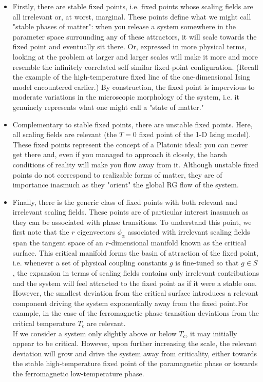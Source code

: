 \begin{itemize}
\item Firstly, there are stable fixed points, i.e. fixed points whose scaling fields are all irrelevant or, at worst, marginal. 
These points define what we might call "stable phases of
matter": when you release a system somewhere in the parameter space surrounding any of these attractors, it will scale towards the fixed point and eventually sit there. Or,
expressed in more physical terms, looking at the problem at larger and larger scales will make it more and more resemble the infinitely correlated self-similar fixed-point configuration. (Recall the example of the high-temperature fixed line of the one-dimensional Ising
model encountered earlier.) 
By construction, the fixed point is impervious to moderate
variations in the microscopic morphology of the system, i.e. it genuinely represents what one might call a "state of matter."
\item Complementary to stable fixed points, there are unstable fixed points. Here, all scaling fields are relevant (the $T = 0$ fixed point of the 1-D Ising model). These fixed points represent the concept of a Platonic ideal: you can never get there and, even if you managed to approach it closely, the harsh conditions of reality will make you flow away from it.
Although unstable fixed points do not correspond to realizable forms of matter, they are of importance inasmuch as they "orient" the global RG flow of the system.
\item Finally, there is the generic class of fixed points with both relevant and irrelevant scaling fields. These points are of particular interest inasmuch as they can be associated with phase transitions. 
To understand this point, we first note that the $r$ eigenvectors $\phi_{\alpha}$ associated with irrelevant scaling fields span the tangent space of an $r$-dimensional
manifold known as the critical surface. 
This critical manifold forms the basin of attraction of the fixed point, i.e. whenever a set of physical coupling constants $g$ is fine-tuned so that $g \in S$, the
expansion in terms of scaling fields contains only irrelevant contributions and the system will feel attracted to the fixed point as if it were a stable one.
\\
However, the smallest deviation from the critical surface introduces a relevant component driving the system exponentially away from the fixed point.For example, in the
case of the ferromagnetic phase transition  deviations from the critical temperature $T_c$ are relevant. 
\\
If we consider a system only slightly above or below $T_c$, it may initially appear to be critical. However, upon further increasing the scale, the relevant deviation will grow and drive the system away from criticality, either towards the stable high-temperature fixed point of the paramagnetic phase or towards the ferromagnetic low-temperature phase.
\end{itemize}

